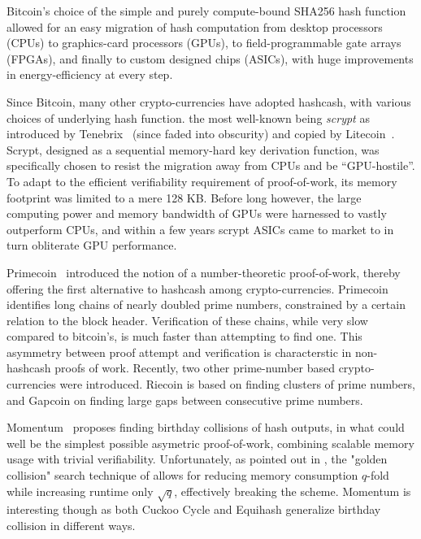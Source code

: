 \documentclass[11pt, oneside]{article}
\begin{document}
Bitcoin's choice of the simple and purely compute-bound SHA256 hash function
allowed for an easy migration of hash computation from 
desktop processors (CPUs) to graphics-card processors (GPUs),
to field-programmable gate arrays (FPGAs), and finally to custom designed
chips (ASICs), with huge improvements in energy-efficiency at every step.

Since Bitcoin, many other crypto-currencies have adopted hashcash, with various
choices of underlying hash function. the most well-known being {\em scrypt} as
introduced by Tenebrix~\cite{tenebrix2011} (since faded into obscurity)
and copied by Litecoin~\cite{litecoin2011}.
Scrypt, designed as a sequential memory-hard key derivation function,
was specifically chosen to resist the migration away from CPUs and be ``GPU-hostile''.
To adapt to the efficient verifiability requirement of proof-of-work, its
memory footprint was limited to a mere 128 KB. Before long however, the large computing power
and memory bandwidth of GPUs were harnessed to vastly outperform CPUs, and within a few years
scrypt ASICs came to market to in turn obliterate GPU performance.

Primecoin~\cite{king2013} introduced the notion of a number-theoretic proof-of-work,
thereby offering the first alternative to hashcash among crypto-currencies.
Primecoin identifies long chains of nearly doubled prime numbers, constrained
by a certain relation to the block header.
Verification of these chains, while very slow compared to bitcoin's, is much faster
than attempting to find one.
This asymmetry between proof attempt and verification is characterstic in non-hashcash proofs of work.
Recently, two other prime-number based crypto-currencies were introduced. Riecoin is based
on finding clusters of prime numbers, and Gapcoin on finding large gaps between consecutive prime numbers.

Momentum~\cite{larimer2013} proposes finding birthday collisions of hash outputs,
in what could well be the simplest possible asymetric proof-of-work,
combining scalable memory usage with trivial verifiability.
Unfortunately, as pointed out in \cite{equihash16}, the "golden collision" search technique of \cite{parallel99}
allows for reducing memory consumption $q$-fold while increasing runtime only $\sqrt{q}$, effectively breaking the scheme.
Momentum is interesting though as both Cuckoo Cycle and Equihash generalize birthday collision in different ways.
\end{document}
